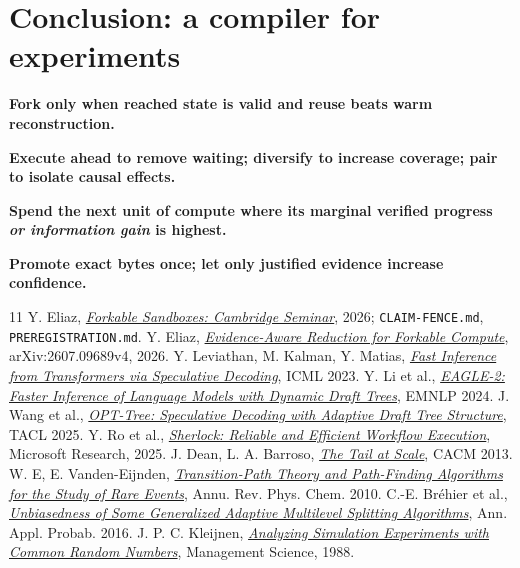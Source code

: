 \documentclass[10pt,twocolumn]{article}
\begin{document}
\section*{Conclusion: a compiler for experiments}
\noindent\colorbox{soft}{\parbox{.945\columnwidth}{\vspace{4pt}\small\textbf{Fork only when reached state is valid and reuse beats warm reconstruction.}\par
\textbf{Execute ahead to remove waiting; diversify to increase coverage; pair to isolate causal effects.}\par
\textbf{Spend the next unit of compute where its marginal verified progress \emph{or information gain} is highest.}\par
\textbf{Promote exact bytes once; let only justified evidence increase confidence.}\vspace{4pt}}}

\begin{thebibliography}{11}\footnotesize\setlength{\itemsep}{1pt}
 Y. Eliaz, \href{https://github.com/zozo123/cam-talk-london-26}{\emph{Forkable Sandboxes: Cambridge Seminar}}, 2026; \texttt{CLAIM-FENCE.md}, \texttt{PREREGISTRATION.md}.
 Y. Eliaz, \href{https://arxiv.org/abs/2607.09689}{\emph{Evidence-Aware Reduction for Forkable Compute}}, arXiv:2607.09689v4, 2026.
 Y. Leviathan, M. Kalman, Y. Matias, \href{https://proceedings.mlr.press/v202/leviathan23a.html}{\emph{Fast Inference from Transformers via Speculative Decoding}}, ICML 2023.
 Y. Li et al., \href{https://aclanthology.org/2024.emnlp-main.422/}{\emph{EAGLE-2: Faster Inference of Language Models with Dynamic Draft Trees}}, EMNLP 2024.
 J. Wang et al., \href{https://aclanthology.org/2025.tacl-1.8/}{\emph{OPT-Tree: Speculative Decoding with Adaptive Draft Tree Structure}}, TACL 2025.
 Y. Ro et al., \href{https://www.microsoft.com/en-us/research/publication/sherlock-reliable-and-efficient-workflow-execution/}{\emph{Sherlock: Reliable and Efficient Workflow Execution}}, Microsoft Research, 2025.
 J. Dean, L. A. Barroso, \href{https://research.google/pubs/the-tail-at-scale/}{\emph{The Tail at Scale}}, CACM 2013.
 W. E, E. Vanden-Eijnden, \href{https://doi.org/10.1146/annurev.physchem.040808.090412}{\emph{Transition-Path Theory and Path-Finding Algorithms for the Study of Rare Events}}, Annu. Rev. Phys. Chem. 2010.
 C.-E. Br\'ehier et al., \href{https://doi.org/10.1214/16-AAP1185}{\emph{Unbiasedness of Some Generalized Adaptive Multilevel Splitting Algorithms}}, Ann. Appl. Probab. 2016.
 J. P. C. Kleijnen, \href{https://doi.org/10.1287/mnsc.34.1.65}{\emph{Analyzing Simulation Experiments with Common Random Numbers}}, Management Science, 1988.
\end{thebibliography}
\end{document}
